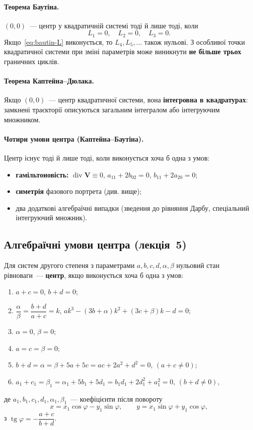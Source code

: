 \documentclass[12pt,a4paper]{article}
\begin{document}
\paragraph{Теорема Баутіна.}
$(0,0)$~--- центр у квадратичній системі тоді й лише тоді, коли
\begin{equation}\label{eq:bautin-L}
  L_1=0,\quad L_2=0,\quad L_3=0.
\end{equation}
Якщо~\eqref{eq:bautin-L} виконується, то $L_4,L_5,\ldots$ також нульові.
З особливої точки квадратичної системи при зміні параметрів може виникнути
\textbf{не більше трьох} граничних циклів.

\paragraph{Теорема Каптейна--Дюлака.}
Якщо $(0,0)$~--- центр квадратичної системи, вона \textbf{інтегровна в
квадратурах}: замкнені траєкторії описуються загальним інтегралом або
інтегруючим множником.

\paragraph{Чотири умови центра (Каптейна--Баутіна).}
Центр існує тоді й лише тоді, коли виконується хоча б одна з умов:
\begin{itemize}[leftmargin=1.6em]
  \item \textbf{гамільтоновість:}
        $\operatorname{div}\mathbf{V}\equiv0$,
        $a_{11}+2b_{02}=0$, $b_{11}+2a_{20}=0$;
  \item \textbf{симетрія} фазового портрета (див. вище);
  \item два додаткові алгебраїчні випадки (зведення до рівняння Дарбу,
        спеціальний інтегруючий множник).
\end{itemize}

\subsection{Алгебраїчні умови центра (лекція~5)}

Для систем другого степеня з параметрами $a,b,c,d,\alpha,\beta$ нульовий стан
рівноваги~--- \textbf{центр}, якщо виконується хоча б одна з умов:
\begin{enumerate}[leftmargin=1.8em]
  \item $a+c=0$, \quad $b+d=0$;
  \item $\dfrac{\alpha}{\beta}=\dfrac{b+d}{a+c}=k$,
        $ak^3-(3b+\alpha)k^2+(3c+\beta)k-d=0$;
  \item $\alpha=0$, \quad $\beta=0$;
  \item $a=c=\beta=0$;
  \item $b+d=\alpha=\beta+5a+5c=ac+2a^2+d^2=0$, \quad $(a+c\neq0)$;
  \item $a_1+c_1=\beta_1=\alpha_1+5b_1+5d_1=b_1 d_1+2d_1^2+a_1^2=0$,
        \quad $(b+d\neq0)$,
\end{enumerate}
де $a_1,b_1,c_1,d_1,\alpha_1,\beta_1$~--- коефіцієнти після повороту
\begin{equation*}
  x=x_1\cos\varphi-y_1\sin\varphi,\qquad
  y=x_1\sin\varphi+y_1\cos\varphi,
\end{equation*}
з $\operatorname{tg}\varphi=-\dfrac{a+c}{b+d}$.
\end{document}
